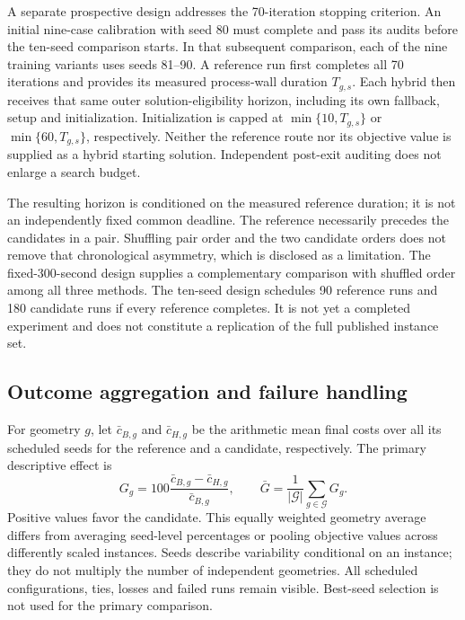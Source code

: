 A separate prospective design addresses the 70-iteration stopping criterion.
An initial nine-case calibration with seed 80 must complete and pass its
audits before the ten-seed comparison starts. In that subsequent comparison,
each of the nine training variants uses seeds 81--90. A reference run first
completes all 70 iterations and provides its measured process-wall duration
$T_{g,s}$. Each hybrid then receives that same outer solution-eligibility
horizon, including its own fallback, setup and initialization. Initialization
is capped at $\min\{10,T_{g,s}\}$ or $\min\{60,T_{g,s}\}$, respectively.
Neither the reference route nor its objective value is supplied as a hybrid
starting solution. Independent post-exit auditing does not enlarge a search
budget.

The resulting horizon is conditioned on the measured reference duration;
it is not an independently fixed common deadline. The reference necessarily
precedes the candidates in a pair. Shuffling pair order and the two candidate
orders does not remove that chronological asymmetry, which is disclosed as
a limitation. The fixed-300-second design supplies a complementary comparison
with shuffled order among all three methods. The ten-seed design schedules
90 reference runs and 180 candidate runs if every reference completes. It
is not yet a completed experiment and does not constitute a replication of
the full published instance set.

\subsection{Outcome aggregation and failure handling}
For geometry $g$, let $\bar c_{B,g}$ and $\bar c_{H,g}$ be the arithmetic
mean final costs over all its scheduled seeds for the reference and a
candidate, respectively. The primary descriptive effect is
\begin{equation}
 G_g=100\frac{\bar c_{B,g}-\bar c_{H,g}}{\bar c_{B,g}},
 \qquad
 \bar G=\frac{1}{|\mathcal G|}\sum_{g\in\mathcal G}G_g.
 \label{eq:geometry-effect}
\end{equation}
Positive values favor the candidate. This equally weighted geometry average
differs from averaging seed-level percentages or pooling objective values
across differently scaled instances. Seeds describe variability conditional
on an instance; they do not multiply the number of independent geometries.
All scheduled configurations, ties, losses and failed runs remain visible.
Best-seed selection is not used for the primary comparison.

